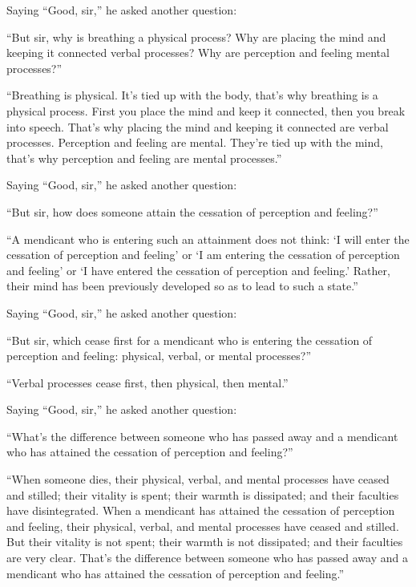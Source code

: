 \documentclass[12pt,openany]{book}%
\begin{document}
Saying “Good, sir,” he asked another question: 

“But sir, why is breathing a physical process? Why are placing the mind and keeping it connected verbal processes? Why are perception and feeling mental processes?” 

“Breathing is physical. It’s tied up with the body, that’s why breathing is a physical process. First you place the mind and keep it connected, then you break into speech. That’s why placing the mind and keeping it connected are verbal processes. Perception and feeling are mental. They’re tied up with the mind, that’s why perception and feeling are mental processes.” 

Saying “Good, sir,” he asked another question: 

“But sir, how does someone attain the cessation of perception and feeling?” 

“A mendicant who is entering such an attainment does not think: ‘I will enter the cessation of perception and feeling’ or ‘I am entering the cessation of perception and feeling’ or ‘I have entered the cessation of perception and feeling.’ Rather, their mind has been previously developed so as to lead to such a state.” 

Saying “Good, sir,” he asked another question: 

“But sir, which cease first for a mendicant who is entering the cessation of perception and feeling: physical, verbal, or mental processes?” 

“Verbal processes cease first, then physical, then mental.” 

Saying “Good, sir,” he asked another question: 

“What’s the difference between someone who has passed away and a mendicant who has attained the cessation of perception and feeling?” 

“When someone dies, their physical, verbal, and mental processes have ceased and stilled; their vitality is spent; their warmth is dissipated; and their faculties have disintegrated. When a mendicant has attained the cessation of perception and feeling, their physical, verbal, and mental processes have ceased and stilled. But their vitality is not spent; their warmth is not dissipated; and their faculties are very clear. That’s the difference between someone who has passed away and a mendicant who has attained the cessation of perception and feeling.” 
\end{document}
